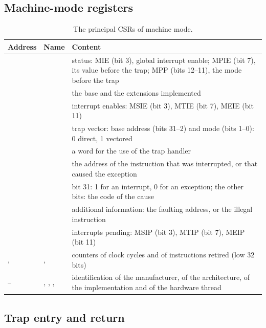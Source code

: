 \subsection{Machine-mode registers}

\begin{table}[htb]
\centering\small
\caption{The principal CSRs of machine mode.}\label{tab:rv:csr}
\begin{tabularx}{\textwidth}{@{}llL@{}}
\toprule
\textbf{Address} & \textbf{Name} & \textbf{Content}\\
\midrule
{} &  & status: MIE (bit 3), global interrupt enable; MPIE (bit 7), its value before the trap; MPP (bits 12--11), the mode before the trap\\
 &  & the base and the extensions implemented\\
 &  & interrupt enables: MSIE (bit 3), MTIE (bit 7), MEIE (bit 11)\\
 &  & trap vector: base address (bits 31--2) and mode (bits 1--0): 0 direct, 1 vectored\\
 &  & a word for the use of the trap handler\\
 &  & the address of the instruction that was interrupted, or that caused the exception\\
 &  & bit 31: 1 for an interrupt, 0 for an exception; the other bits: the code of the cause\\
 &  & additional information: the faulting address, or the illegal instruction\\
 &  & interrupts pending: MSIP (bit 3), MTIP (bit 7), MEIP (bit 11)\\
,  & ,  & counters of clock cycles and of instructions retired (low 32 bits)\\
-- & , , ,  & identification of the manufacturer, of the architecture, of the implementation and of the hardware thread\\
\bottomrule
\end{tabularx}
\end{table}

\subsection{Trap entry and return}

